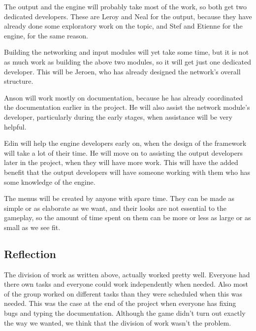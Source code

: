     The output and the engine will probably take most of the work, so both get two dedicated developers. These are Leroy and Neal for the output, because they have already done some exploratory work on the topic, and Stef and Etienne for the engine, for the same reason.

    Building the networking and input modules will yet take some time, but it is not as much work as building the above two modules, so it will get just one dedicated developer. This will be Jeroen, who has already designed the network's overall structure.

    Anson will work mostly on documentation, because he has already coordinated the documentation earlier in the project. He will also assist the network module's developer, particularly during the early stages, when assistance will be very helpful.

    Edin will help the engine developers early on, when the design of the framework will take a lot of their time. He will move on to assisting the output developers later in the project, when they will have more work. This will have the added benefit that the output developers will have someone working with them who has some knowledge of the engine.

    The menus will be created by anyone with spare time. They can be made as simple or as elaborate as we want, and their looks are not essential to the gameplay, so the amount of time spent on them can be more or less as large or as small as we see fit.
    
    \subsection{Reflection}
    The division of work as written above, actually worked pretty well. Everyone had there own tasks and everyone could work independently when needed. Also most of the group worked on different tasks than they were scheduled when this was needed. This was the case at the end of the project when everyone has fixing bugs and typing the documentation. Although the game didn't turn out exactly the way we wanted, we think that the division of work wasn't the problem.


